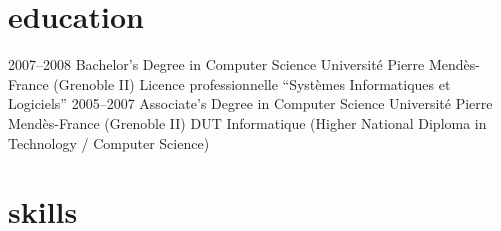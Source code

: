 \documentclass[]{friggeri-cv} %
\begin{document}
\section{education}

\begin{entrylist}
\entry
{2007--2008}
{Bachelor's Degree {\normalfont in Computer Science}}
{Université Pierre Mendès-France (Grenoble II)}
{Licence professionnelle ``Systèmes Informatiques et Logiciels''}
\entry
{2005--2007}
{Associate's Degree {\normalfont in Computer Science}}
{Université Pierre Mendès-France (Grenoble II)}
{DUT Informatique (Higher National Diploma in Technology / Computer Science)}
\end{entrylist}


\section{skills}
\end{document}
